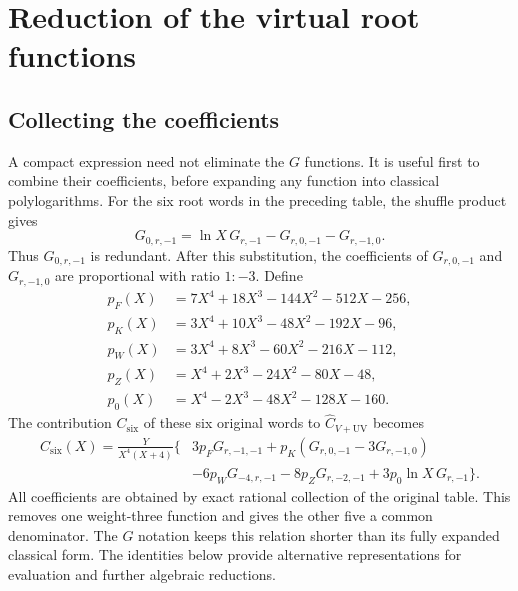 \section{Reduction of the virtual root functions}
\subsection{Collecting the coefficients}
A compact expression need not eliminate the $G$ functions. It is useful
first to combine their coefficients, before expanding any function into
classical polylogarithms. For the six root words in the preceding table,
the shuffle product gives
\begin{equation}
 G_{0,r,-1}=\ln X\,G_{r,-1}-G_{r,0,-1}-G_{r,-1,0}.
 \label{eq:comp-root-compact-shuffle}
\end{equation}
Thus $G_{0,r,-1}$ is redundant. After this substitution, the coefficients
of $G_{r,0,-1}$ and $G_{r,-1,0}$ are proportional with ratio $1:-3$.
Define
\begin{align}
 p_F(X)&=7X^4+18X^3-144X^2-512X-256,\\
 p_K(X)&=3X^4+10X^3-48X^2-192X-96,\\
 p_W(X)&=3X^4+8X^3-60X^2-216X-112,\\
 p_Z(X)&=X^4+2X^3-24X^2-80X-48,\\
 p_0(X)&=X^4-2X^3-48X^2-128X-160.
 \label{eq:comp-root-compact-polynomials}
\end{align}
The contribution $C_{\mathrm{six}}$ of these six original words to
$\widehat C_{V+\mathrm{UV}}$ becomes
\begin{equation}
 \begin{aligned}
 C_{\mathrm{six}}(X)=\frac{Y}{X^4(X+4)}\bigl\{&
 3p_FG_{r,-1,-1}+p_K(G_{r,0,-1}-3G_{r,-1,0})\\
 &-6p_WG_{-4,r,-1}-8p_ZG_{r,-2,-1}
       +3p_0\ln X\,G_{r,-1}\bigr\}.
 \end{aligned}
 \label{eq:comp-root-compact-G}
\end{equation}
All coefficients are obtained by exact rational collection of the original
table. This removes one weight-three function and gives the other five a
common denominator. The $G$ notation keeps this relation shorter than its
fully expanded classical form. The identities below provide alternative
representations for evaluation and further algebraic reductions.
